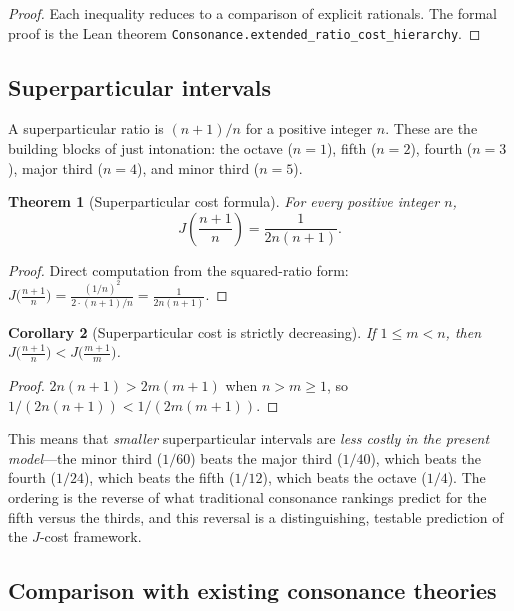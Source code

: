 \documentclass[11pt,a4paper]{article}
\newtheorem{theorem}{Theorem}
\newtheorem{corollary}[theorem]{Corollary}
\begin{document}
\begin{proof}
Each inequality reduces to a comparison of explicit rationals.  The
formal proof is the Lean theorem
\texttt{Consonance.extended\_ratio\_cost\_hierarchy}.
\end{proof}

\subsection{Superparticular intervals}

A superparticular ratio is $(n+1)/n$ for a positive integer $n$.  These
are the building blocks of just intonation: the octave ($n=1$), fifth
($n=2$), fourth ($n=3$), major third ($n=4$), and minor third ($n=5$).

\begin{theorem}[Superparticular cost formula]
\label{thm:super}
For every positive integer $n$,
\[
  J\!\left(\frac{n+1}{n}\right) = \frac{1}{2n(n+1)}.
\]
\end{theorem}

\begin{proof}
Direct computation from the squared-ratio form:
$J\bigl(\frac{n+1}{n}\bigr) = \frac{(1/n)^2}{2\cdot(n+1)/n}
= \frac{1}{2n(n+1)}$.
\end{proof}

\begin{corollary}[Superparticular cost is strictly decreasing]
\label{cor:super-dec}
If $1\leq m<n$, then
$J\bigl(\frac{n+1}{n}\bigr) < J\bigl(\frac{m+1}{m}\bigr)$.
\end{corollary}

\begin{proof}
$2n(n+1)>2m(m+1)$ when $n>m\geq 1$, so $1/(2n(n+1))<1/(2m(m+1))$.
\end{proof}

\noindent This means that \emph{smaller} superparticular intervals are
\emph{less costly in the present model}---the minor third ($1/60$) beats the major third
($1/40$), which beats the fourth ($1/24$), which beats the fifth
($1/12$), which beats the octave ($1/4$).  The ordering is the reverse
of what traditional consonance rankings predict for the fifth versus the
thirds, and this reversal is a distinguishing, testable prediction of
the $J$-cost framework.

\subsection{Comparison with existing consonance theories}
\end{document}
